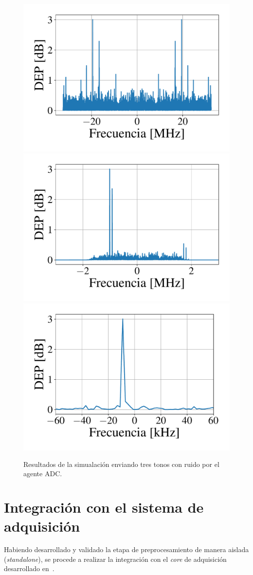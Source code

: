 \documentclass[../../main.tex]{subfiles}
\begin{document}
\begin{figure}[H]
    \centering
    {\includegraphics[width=0.49\linewidth]{tresTonosMuchoRuido-dataInFreq.pdf}}
    \hspace{\fill}%
    {\includegraphics[width=0.49\linewidth]{tresTonosMuchoRuido-bandFilterFreq.pdf}}
    \\[1PC]
    {\includegraphics[width=0.49\linewidth]{tresTonosMuchoRuido-channelFreq.pdf}}
    \caption{Resultados de la simualación enviando tres tonos con ruido por el agente ADC.}
    \label{fig::tresTonosMuchoRuido}
\end{figure}

\section{Integración con el sistema de adquisición}
Habiendo desarrollado y validado la etapa de preprocesamiento de manera aislada (\textit{standalone}), se procede a realizar la integración con el \textit{core} de adquisición desarrollado en~\cite{proyecto-jose}.
\end{document}
